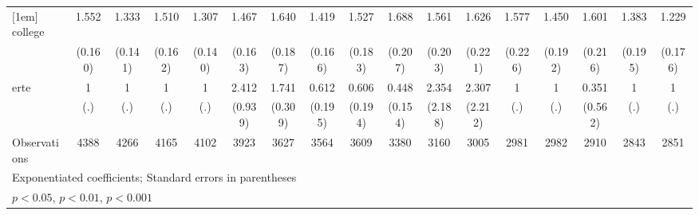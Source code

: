 {\begin{tabular}{l*{16}{c}}
[1em]
college             &       1.552\sym{***}&       1.333\sym{**} &       1.510\sym{***}&       1.307\sym{*}  &       1.467\sym{***}&       1.640\sym{***}&       1.419\sym{**} &       1.527\sym{***}&       1.688\sym{***}&       1.561\sym{***}&       1.626\sym{***}&       1.577\sym{**} &       1.450\sym{**} &       1.601\sym{***}&       1.383\sym{*}  &       1.229         \\
                    &     (0.160)         &     (0.141)         &     (0.162)         &     (0.140)         &     (0.163)         &     (0.187)         &     (0.166)         &     (0.183)         &     (0.207)         &     (0.203)         &     (0.221)         &     (0.226)         &     (0.192)         &     (0.216)         &     (0.195)         &     (0.176)         \\
[1em]
erte                &           1         &           1         &           1         &           1         &       2.412\sym{*}  &       1.741\sym{**} &       0.612         &       0.606         &       0.448\sym{*}  &       2.354         &       2.307         &           1         &           1         &       0.351         &           1         &           1         \\
                    &         (.)         &         (.)         &         (.)         &         (.)         &     (0.939)         &     (0.309)         &     (0.195)         &     (0.194)         &     (0.154)         &     (2.188)         &     (2.212)         &         (.)         &         (.)         &     (0.562)         &         (.)         &         (.)         \\
\hline
Observations        &        4388         &        4266         &        4165         &        4102         &        3923         &        3627         &        3564         &        3609         &        3380         &        3160         &        3005         &        2981         &        2982         &        2910         &        2843         &        2851         \\
\hline\hline
\multicolumn{17}{l}{\footnotesize Exponentiated coefficients; Standard errors in parentheses}\\
\multicolumn{17}{l}{\footnotesize \sym{*} \(p<0.05\), \sym{**} \(p<0.01\), \sym{***} \(p<0.001\)}\\
\end{tabular}
}
